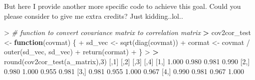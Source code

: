 \documentclass[
]{article}
\newenvironment{Shaded}{\begin{snugshade}}{\end{snugshade}}
\newcommand{\CommentTok}[1]{\textcolor[rgb]{0.56,0.35,0.01}{\textit{#1}}}
\newcommand{\ControlFlowTok}[1]{\textcolor[rgb]{0.13,0.29,0.53}{\textbf{#1}}}
\newcommand{\DecValTok}[1]{\textcolor[rgb]{0.00,0.00,0.81}{#1}}
\newcommand{\ErrorTok}[1]{\textcolor[rgb]{0.64,0.00,0.00}{\textbf{#1}}}
\newcommand{\FloatTok}[1]{\textcolor[rgb]{0.00,0.00,0.81}{#1}}
\newcommand{\FunctionTok}[1]{\textcolor[rgb]{0.00,0.00,0.00}{#1}}
\newcommand{\NormalTok}[1]{#1}
\newcommand{\OtherTok}[1]{\textcolor[rgb]{0.56,0.35,0.01}{#1}}
\newcommand{\SpecialCharTok}[1]{\textcolor[rgb]{0.00,0.00,0.00}{#1}}
\begin{document}
But here I provide another more specific code to achieve this goal.
Could you please consider to give me extra credits? Just kidding..lol..

\begin{Shaded}
\begin{Highlighting}[]
\SpecialCharTok{\textgreater{}} \CommentTok{\# function to convert covariance matrix to correlation matrix}
\ErrorTok{\textgreater{}}\NormalTok{ cov2cor\_test }\OtherTok{\textless{}{-}} \ControlFlowTok{function}\NormalTok{(covmat) \{}
\SpecialCharTok{+}\NormalTok{     sd\_vec }\OtherTok{\textless{}{-}} \FunctionTok{sqrt}\NormalTok{(}\FunctionTok{diag}\NormalTok{(covmat))}
\SpecialCharTok{+}\NormalTok{     cormat }\OtherTok{\textless{}{-}}\NormalTok{ covmat }\SpecialCharTok{/} \FunctionTok{outer}\NormalTok{(sd\_vec, sd\_vec)}
\SpecialCharTok{+}     \FunctionTok{return}\NormalTok{(cormat)}
\SpecialCharTok{+}\NormalTok{ \}}
\SpecialCharTok{\textgreater{}} 
\ErrorTok{\textgreater{}} \FunctionTok{round}\NormalTok{(}\FunctionTok{cov2cor\_test}\NormalTok{(a\_matrix),}\DecValTok{3}\NormalTok{)}
\NormalTok{      [,}\DecValTok{1}\NormalTok{]  [,}\DecValTok{2}\NormalTok{]  [,}\DecValTok{3}\NormalTok{]  [,}\DecValTok{4}\NormalTok{]}
\NormalTok{[}\DecValTok{1}\NormalTok{,] }\FloatTok{1.000} \FloatTok{0.980} \FloatTok{0.981} \FloatTok{0.990}
\NormalTok{[}\DecValTok{2}\NormalTok{,] }\FloatTok{0.980} \FloatTok{1.000} \FloatTok{0.955} \FloatTok{0.981}
\NormalTok{[}\DecValTok{3}\NormalTok{,] }\FloatTok{0.981} \FloatTok{0.955} \FloatTok{1.000} \FloatTok{0.967}
\NormalTok{[}\DecValTok{4}\NormalTok{,] }\FloatTok{0.990} \FloatTok{0.981} \FloatTok{0.967} \FloatTok{1.000}
\end{Highlighting}
\end{Shaded}
\end{document}

